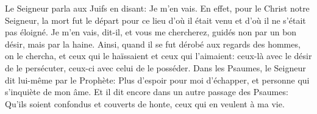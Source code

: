 Le Seigneur parla aux Juifs en disant: Je m’en vais.
En effet, pour le Christ notre Seigneur,
	la mort fut le départ pour ce lieu d’où il était venu
	et d’où il ne s’était pas éloigné.
Je m’en vais, dit-il, et vous me chercherez,
	guidés non par un bon désir, mais par la haine.
Ainsi, quand il se fut dérobé aux regards des hommes,
	on le chercha, et ceux qui le haïssaient et ceux qui l’aimaient:
	ceux-là avec le désir de le persécuter, ceux-ci avec celui de le posséder.
Dans les Psaumes, le Seigneur dit lui-même par le Prophète:
	Plus d’espoir pour moi d’échapper, et personne qui s’inquiète de mon âme.
Et il dit encore dans un autre passage des Psaumes:
	Qu’ils soient confondus et couverts de honte, ceux qui en veulent à ma vie.
